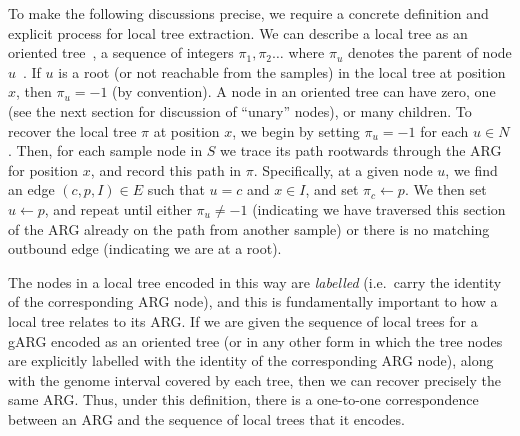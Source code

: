\documentclass{article}
\begin{document}
To make the following discussions precise, we require
a concrete definition and explicit process for local tree extraction.
We can describe a local tree as an
oriented tree~\cite[p.\ 461]{knuth11combinatorial},
a sequence of integers $\pi_1, \pi_2\dots$ where $\pi_u$ denotes the parent of
node $u$~\citep{kelleher2013coalescent,kelleher2014coalescent,kelleher2016efficient}.
If $u$ is a root
(or not reachable from the samples)
in the local tree at position $x$, then $\pi_u = -1$ (by convention).
A node in an oriented tree can have
zero, one (see the next section for discussion of ``unary'' nodes),
or many children.
To recover the local tree $\pi$ at position $x$, we begin by
setting $\pi_u = -1$ for each $u\in N$. Then, for each sample
node in $S$ we trace its path rootwards through the
ARG for position $x$, and record this path in $\pi$.
Specifically, at a given node $u$,
we find an edge $(c, p, I) \in E$ such that $u = c$ and $x \in I$, and set
$\pi_c \leftarrow p$. We then set $u \leftarrow p$, and repeat
until either $\pi_u \neq -1$ (indicating we have traversed this section
of the ARG already on the path from another sample) or there
is no matching outbound edge (indicating we are at a root).

The nodes in a local tree encoded
in this way are \emph{labelled} (i.e.\ carry the identity
of the corresponding ARG node), and this is fundamentally
important to how a local tree relates to its ARG.
If we are given the sequence of local trees for a gARG
encoded as an oriented tree (or in any other form in which
the tree nodes are explicitly labelled with the identity of the
corresponding ARG node),
along with the genome interval covered by each tree,
then we can recover precisely the same ARG. Thus, under this
definition, there
is a one-to-one correspondence between an ARG and
the sequence of local trees that it encodes.
\end{document}
